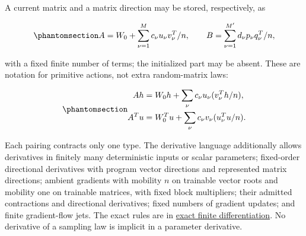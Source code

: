 \documentclass[
  11pt,
]{article}
\theoremstyle{definition}
\theoremstyle{plain}
\theoremstyle{plain}
\theoremstyle{plain}
\theoremstyle{remark}
\begin{document}
A current matrix and a matrix direction may be stored, respectively, as

\begin{equation}\protect\phantomsection\label{eq-mfp-represented-matrices}{
A=W_0+\sum_{\nu=1}^M c_\nu u_\nu v_\nu^T/n,
\qquad B=\sum_{\nu=1}^{M'} d_\nu p_\nu q_\nu^T/n,
}\end{equation}

with a fixed finite number of terms; the initialized part may be absent.
These are notation for primitive actions, not extra random-matrix laws:

\begin{equation}\protect\phantomsection\label{eq-mfp-rank-lowering}{
\begin{aligned}
Ah&=W_0h+\sum_\nu c_\nu u_\nu(v_\nu^Th/n),\\
A^Tu&=W_0^Tu+\sum_\nu c_\nu v_\nu(u_\nu^Tu/n).
\end{aligned}
}\end{equation}

Each pairing contracts only one type. The derivative language
additionally allows derivatives in finitely many deterministic inputs or
scalar parameters; fixed-order directional derivatives with program
vector directions and represented matrix directions; ambient gradients
with mobility \(n\) on trainable vector roots and mobility one on
trainable matrices, with fixed block multipliers; their admitted
contractions and directional derivatives; fixed numbers of gradient
updates; and finite gradient-flow jets. The exact rules are in
\hyperref[sec-mfp-physical-differentiation]{exact finite
differentiation}. No derivative of a sampling law is implicit in a
parameter derivative.
\end{document}
